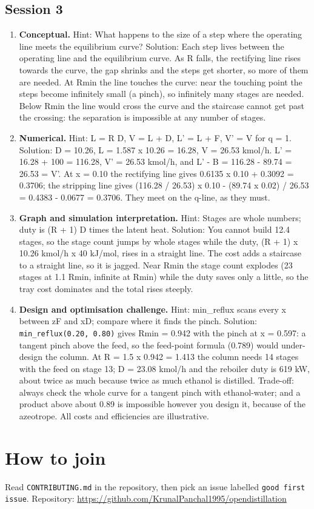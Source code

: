 \documentclass[11pt,a4paper]{article}
\begin{document}
\subsection*{Session 3}
\begin{enumerate}[nosep]
\item \textbf{Conceptual.} Hint: What happens to the size of a step where the operating line meets the equilibrium curve? Solution: Each step lives between the operating line and the equilibrium curve. As R falls, the rectifying line rises towards the curve, the gap shrinks and the steps get shorter, so more of them are needed. At Rmin the line touches the curve: near the touching point the steps become infinitely small (a pinch), so infinitely many stages are needed. Below Rmin the line would cross the curve and the staircase cannot get past the crossing: the separation is impossible at any number of stages.
\item \textbf{Numerical.} Hint: L = R D, V = L + D, L' = L + F, V' = V for q = 1. Solution: D = 10.26, L = 1.587 x 10.26 = 16.28, V = 26.53 kmol/h. L' = 16.28 + 100 = 116.28, V' = 26.53 kmol/h, and L' - B = 116.28 - 89.74 = 26.53 = V'. At x = 0.10 the rectifying line gives 0.6135 x 0.10 + 0.3092 = 0.3706; the stripping line gives (116.28 / 26.53) x 0.10 - (89.74 x 0.02) / 26.53 = 0.4383 - 0.0677 = 0.3706. They meet on the q-line, as they must.
\item \textbf{Graph and simulation interpretation.} Hint: Stages are whole numbers; duty is (R + 1) D times the latent heat. Solution: You cannot build 12.4 stages, so the stage count jumps by whole stages while the duty, (R + 1) x 10.26 kmol/h x 40 kJ/mol, rises in a straight line. The cost adds a staircase to a straight line, so it is jagged. Near Rmin the stage count explodes (23 stages at 1.1 Rmin, infinite at Rmin) while the duty saves only a little, so the tray cost dominates and the total rises steeply.
\item \textbf{Design and optimisation challenge.} Hint: min\_reflux scans every x between zF and xD; compare where it finds the pinch. Solution: \texttt{min\_reflux(0.20, 0.80)} gives Rmin = 0.942 with the pinch at x = 0.597: a tangent pinch above the feed, so the feed-point formula (0.789) would under-design the column. At R = 1.5 x 0.942 = 1.413 the column needs 14 stages with the feed on stage 13; D = 23.08 kmol/h and the reboiler duty is 619 kW, about twice as much because twice as much ethanol is distilled. Trade-off: always check the whole curve for a tangent pinch with ethanol-water; and a product above about 0.89 is impossible however you design it, because of the azeotrope. All costs and efficiencies are illustrative.
\end{enumerate}

\section{How to join}
Read \texttt{CONTRIBUTING.md} in the repository, then pick an issue labelled \texttt{good first issue}. Repository: \url{https://github.com/KrunalPanchal1995/opendistillation}
\end{document}
